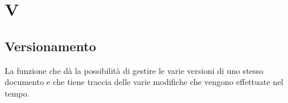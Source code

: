 \section{V}

\subsection{Versionamento}
La funzione che dà la possibilità di gestire le varie versioni di uno stesso documento e che tiene traccia delle varie modifiche che vengono effettuate nel tempo.


\clearpage